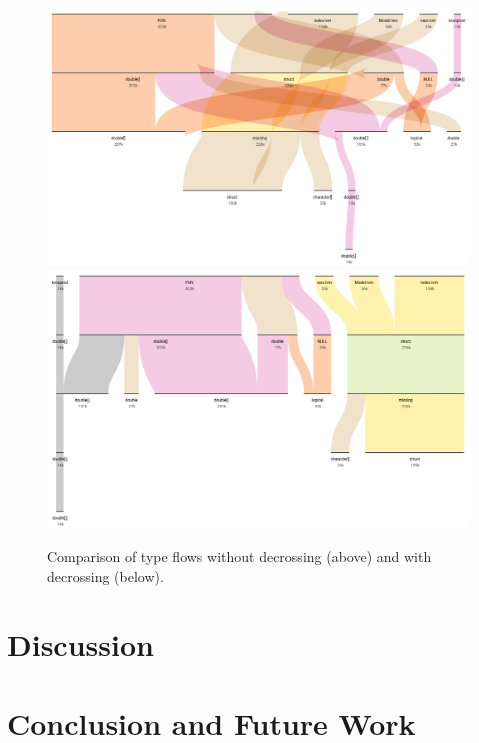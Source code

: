 \documentclass{vgtc}                          %
\begin{document}
\begin{figure}[tb]
 \centering
 \includegraphics[width=\columnwidth]{img/no_decross.png}
 \includegraphics[width=\columnwidth]{img/decross.png}
 \caption{Comparison of type flows without decrossing (above) and with decrossing (below).}
 \label{fig:decross}
\end{figure}


\section{Discussion}



\section{Conclusion and Future Work}

\end{document}
